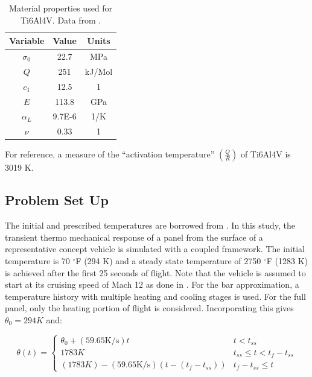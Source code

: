 \documentclass[conf]{new-aiaa}
\begin{document}
\begin{table}[H]
  \centering
  \caption{
    Material properties used for Ti6Al4V.
    Data from 
    \cite{ lavina_creep_behavior_of_Ti6Al4V_from_450C_to_600C,
      boyer_materials_properties_handbook_titanium_alloys}.}
  \begin{tabular}{|c|c|c|}
    \hline
    Variable & Value & Units  \\
    \hline
    $\sigma_0$ & 22.7  & MPa    \\
    $Q$      & 251     & kJ/Mol \\
    $c_1$    & 12.5    & 1      \\
    $E$      & 113.8   & GPa    \\
    $\alpha_L$ & 9.7E-6  & 1/K    \\
    $\nu$    & 0.33    & 1      \\
    \hline
  \end{tabular}
  \label{tab_material_properties}
\end{table}

\noindent
For reference, a measure of the ``activation temperature'' 
$\left(\frac{Q}{R}\right)$ of Ti6Al4V is 3019 K.

\subsection{Problem Set Up}
The initial and prescribed temperatures are borrowed from 
\cite{ culler_impact_of_FTS_coupling_on_response_prediction_hypersonic_skin_panels}.
In this study, the transient thermo mechanical response of a panel from the 
surface of a representative concept vehicle is simulated with a coupled framework.
The initial temperature is 70 $^{\circ}$F (294 K) and a steady state temperature 
of 2750 $^{\circ}$F (1283 K) is achieved after the first 25 seconds of flight.
Note that the vehicle is assumed to start at its cruising speed of Mach 12
as done in \cite{ culler_impact_of_FTS_coupling_on_response_prediction_hypersonic_skin_panels}.
For the bar approximation, a temperature history with multiple
heating and cooling stages is used.
For the full panel, only the heating portion of flight is considered.
Incorporating this gives $\theta_0 = 294 K$ and:

\begin{equation}
\theta(t) = \begin{cases}
 \theta_0 + (59.65 \text{K/s})t                & t < t_{ss} \\
1783 K                                         & t_{ss} \leq t < t_f-t_{ss} \\
(1783 K) - (59.65 \text{K/s})(t-(t_f-t_{ss}))  & t_f - t_{ss} \leq t
\end{cases}
\end{equation}
\end{document}
